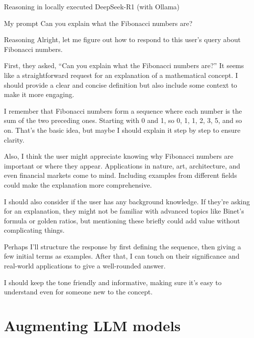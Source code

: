 \documentclass[10pt]{beamer}
\begin{document}
\begin{frame}[standout]{Reasoning in locally executed DeepSeek-R1 (with Ollama)}
	
	\begin{alertblock}{My prompt}
		\small Can you explain what the Fibonacci numbers are?
	\end{alertblock}
	
	\begin{alertblock}{Reasoning}
		\footnotesize \normalfont
		Alright, let me figure out how to respond to this user’s query about Fibonacci numbers.
		
		First, they asked, “Can you explain what the Fibonacci numbers are?” It seems like a straightforward request for an explanation
		of a mathematical concept. I should provide a clear and concise definition but also include some context to make it more
		engaging.
		
		I remember that Fibonacci numbers form a sequence where each number is the sum of the two preceding ones. Starting with 0 and 1, so 0, 1, 1, 2, 3, 5, and so on. That’s the basic idea, but maybe I should explain it step by step to ensure clarity.
		
		Also, I think the user might appreciate knowing why Fibonacci numbers are important or where they appear. Applications in
		nature, art, architecture, and even financial markets come to mind. Including examples from different fields could make the
		explanation more comprehensive.
		
		I should also consider if the user has any background knowledge. If they’re asking for an explanation, they might not be
		familiar with advanced topics like Binet’s formula or golden ratios, but mentioning these briefly could add value without
		complicating things.
		
		Perhaps I’ll structure the response by first defining the sequence, then giving a few initial terms as examples. After that, I
		can touch on their significance and real-world applications to give a well-rounded answer.
		
		I should keep the tone friendly and informative, making sure it’s easy to understand even for someone new to the concept.
	\end{alertblock}
\end{frame}


\section{Augmenting LLM models}
\end{document}
